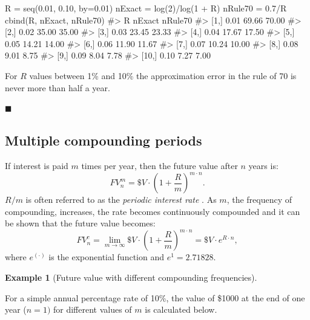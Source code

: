 \documentclass[
  letterpaper,
  DIV=11,
  numbers=noendperiod]{scrreprt}
\newenvironment{Shaded}{\begin{snugshade}}{\end{snugshade}}
\newcommand{\AttributeTok}[1]{\textcolor[rgb]{0.40,0.45,0.13}{#1}}
\newcommand{\CommentTok}[1]{\textcolor[rgb]{0.37,0.37,0.37}{#1}}
\newcommand{\DecValTok}[1]{\textcolor[rgb]{0.68,0.00,0.00}{#1}}
\newcommand{\FloatTok}[1]{\textcolor[rgb]{0.68,0.00,0.00}{#1}}
\newcommand{\FunctionTok}[1]{\textcolor[rgb]{0.28,0.35,0.67}{#1}}
\newcommand{\NormalTok}[1]{\textcolor[rgb]{0.00,0.23,0.31}{#1}}
\newcommand{\OtherTok}[1]{\textcolor[rgb]{0.00,0.23,0.31}{#1}}
\newcommand{\SpecialCharTok}[1]{\textcolor[rgb]{0.37,0.37,0.37}{#1}}
\theoremstyle{definition}
\theoremstyle{definition}
\newtheorem{example}{Example}[chapter]
\theoremstyle{remark}
\begin{document}
\begin{Shaded}
\begin{Highlighting}[]
\NormalTok{R }\OtherTok{=} \FunctionTok{seq}\NormalTok{(}\FloatTok{0.01}\NormalTok{, }\FloatTok{0.10}\NormalTok{, }\AttributeTok{by=}\FloatTok{0.01}\NormalTok{) }
\NormalTok{nExact }\OtherTok{=} \FunctionTok{log}\NormalTok{(}\DecValTok{2}\NormalTok{)}\SpecialCharTok{/}\FunctionTok{log}\NormalTok{(}\DecValTok{1} \SpecialCharTok{+}\NormalTok{ R) }
\NormalTok{nRule70 }\OtherTok{=} \FloatTok{0.7}\SpecialCharTok{/}\NormalTok{R }
\FunctionTok{cbind}\NormalTok{(R, nExact, nRule70)}
\CommentTok{\#\textgreater{}          R nExact nRule70}
\CommentTok{\#\textgreater{}  [1,] 0.01  69.66   70.00}
\CommentTok{\#\textgreater{}  [2,] 0.02  35.00   35.00}
\CommentTok{\#\textgreater{}  [3,] 0.03  23.45   23.33}
\CommentTok{\#\textgreater{}  [4,] 0.04  17.67   17.50}
\CommentTok{\#\textgreater{}  [5,] 0.05  14.21   14.00}
\CommentTok{\#\textgreater{}  [6,] 0.06  11.90   11.67}
\CommentTok{\#\textgreater{}  [7,] 0.07  10.24   10.00}
\CommentTok{\#\textgreater{}  [8,] 0.08   9.01    8.75}
\CommentTok{\#\textgreater{}  [9,] 0.09   8.04    7.78}
\CommentTok{\#\textgreater{} [10,] 0.10   7.27    7.00}
\end{Highlighting}
\end{Shaded}

For \(R\) values between 1\% and 10\% the approximation error in the
rule of 70 is never more than half a year.

\hfill{}\(\blacksquare\)

\hypertarget{multiple-compounding-periods}{%
\subsection{Multiple compounding
periods}\label{multiple-compounding-periods}}

 If interest is paid \(m\) times per year, then
the future value after \(n\) years is:
\[FV_{n}^{m}=\$V\cdot\left(1+\frac{R}{m}\right)^{m\cdot n}.\] \(R/m\) is
often referred to as the \emph{periodic interest rate}
. As \(m\), the frequency of compounding,
increases, the rate becomes continuously compounded and it can be shown
that the future value becomes:
\[FV_{n}^{c}=\lim_{m\rightarrow\infty}\$V\cdot\left(1+\frac{R}{m}\right)^{m\cdot n}=\$V\cdot e^{R\cdot n},\]
where \(e^{(\cdot)}\) is the exponential function and \(e^{1}=2.71828\).

\begin{example}[Future value with different compounding
frequencies]\protect\hypertarget{exm-example0103}{}\label{exm-example0103}

For a simple annual percentage rate of 10\%, the value of \$1000 at the
end of one year (\(n=1)\) for different values of \(m\) is calculated
below.

\end{example}
\end{document}
